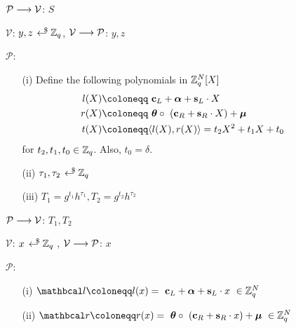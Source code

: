 \begin{mdframed}
\begin{itemize}[itemsep=4pt]
    \item[] $\mathcal{P} \longrightarrow \V$: $S$
    
    \item[] $\mathcal{V}$: $y, z \rgen \Z_q$, $\mathcal{V} \longrightarrow \P$: $y, z$
    
    
    \item[] $\mathcal{P}$:
    \begin{enumerate}[itemsep=5pt]
      \item[(i)] Define the following polynomials in $\Z^{N}_q[X]$
      \begin{align*}
          l(X) &\coloneqq \ \textbf{c}_L + \boldsymbol{\alpha} + \textbf{s}_L \cdot X \\
          r(X) &\coloneqq \ \vecnb{\theta} \circ \ (\textbf{c}_R + \textbf{s}_R \cdot X) + \vecnb{\mu}\\
          t(X) &\coloneqq \langle l(X),r(X) \rangle = t_2 X^2 + t_1 X + t_0
      \end{align*}
      for $t_2, t_1, t_0 \in \Z_q$. Also, $t_0 = \delta$.
        
      \item[(ii)] $\tau_1, \tau_2 \rgen \Z_q$ 
      
      \item[(iii)] $T_1 = g^{t_1}h^{\tau_1}, T_2 = g^{t_2}h^{\tau_2}$ 
    \end{enumerate}
        
    \item[] $\mathcal{P} \longrightarrow \V$: $T_1, T_2$
  
    \item[] $\mathcal{V}$: $x \rgen \Z_q$ , $\mathcal{V} \longrightarrow \P$: $x$


    \item[] $\mathcal{P}$: 
    \begin{enumerate}[itemsep=5pt]
        \item[(i)] $\lvec \coloneqq l(x) = \ \textbf{c}_L + \vecnb{\alpha} + \textbf{s}_L \cdot x \ \in \Z_q^N$
        
        \item[(ii)] $\rvec \coloneqq r(x) = \ \vecnb{\theta} \circ \ (\textbf{c}_R + \textbf{s}_R \cdot x) + \vecnb{\mu} \ \in \Z^N_q$
        

\end{enumerate}
\end{itemize}
\end{mdframed}
